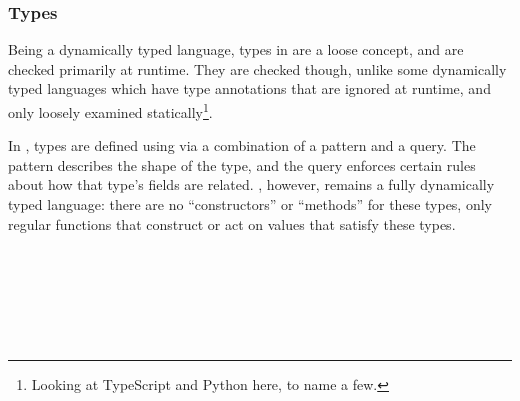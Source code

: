 \subsubsection{Types}

%

Being a dynamically typed language, types in \Trilogy{} are a loose concept,
and are checked primarily at runtime. They are checked though, unlike some
dynamically typed languages which have type annotations that are
ignored at runtime, and only loosely examined statically\footnote{Looking at TypeScript and Python here, to name a few.}.

In \Trilogy{}, types are defined using \Law{} via a combination of a pattern
and a query. The pattern describes the shape of the type, and the query
enforces certain rules about how that type's fields are related. \Trilogy{},
however, remains a fully dynamically typed language: there are no ``constructors''
or ``methods'' for these types, only regular functions that construct or act on
values that satisfy these types.

\begin{bnf*}
     \\
     \\
     \\
     \\
     \\
\end{bnf*}

